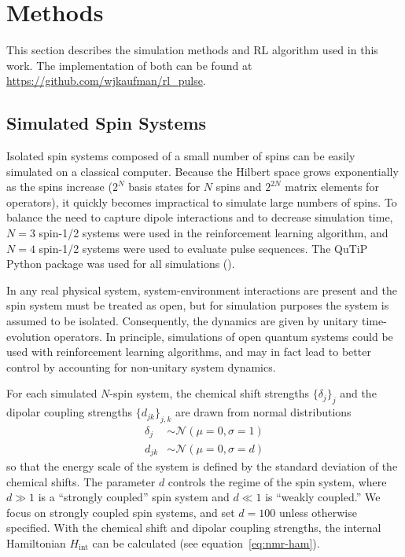 
\chapter{Methods} %



This section describes the simulation methods and RL algorithm used in this work. The implementation of both can be found at \url{https://github.com/wjkaufman/rl_pulse}.

\section{Simulated Spin Systems}

Isolated spin systems composed of a small number of spins can be easily simulated on a classical computer. Because the Hilbert space grows exponentially as the spins increase ($2^N$ basis states for $N$ spins and $2^{2N}$ matrix elements for operators), it quickly becomes impractical to simulate large numbers of spins. To balance the need to capture dipole interactions and to decrease simulation time, $N=3$ spin-1/2 systems were used in the reinforcement learning algorithm, and $N=4$ spin-1/2 systems were used to evaluate pulse sequences. The QuTiP Python package was used for all simulations (\cite{Johansson_2013}).

In any real physical system, system-environment interactions are present and the spin system must be treated as open, but for simulation purposes the system is assumed to be isolated.
Consequently, the dynamics are given by unitary time-evolution operators. In principle, simulations of open quantum systems could be used with reinforcement learning algorithms, and may in fact lead to better control by accounting for non-unitary system dynamics.

For each simulated $N$-spin system, the chemical shift strengths $\{\delta_j\}_j$ and the dipolar coupling strengths $\{d_{jk}\}_{j,k}$ are drawn from normal distributions
\begin{align}
    \delta_j &\sim \mathcal{N}(\mu=0, \sigma=1) \\
    d_{jk} &\sim \mathcal{N}(\mu=0, \sigma=d)
\end{align}
so that the energy scale of the system is defined by the standard deviation of the chemical shifts. The parameter $d$ controls the regime of the spin system, where $d \gg 1$ is a ``strongly coupled'' spin system and $d \ll 1$ is ``weakly coupled.'' We focus on strongly coupled spin systems, and set $d = 100$ unless otherwise specified. With the chemical shift and dipolar coupling strengths, the internal Hamiltonian $H_{\text{int}}$ can be calculated (see equation~\ref{eq:nmr-ham}).

